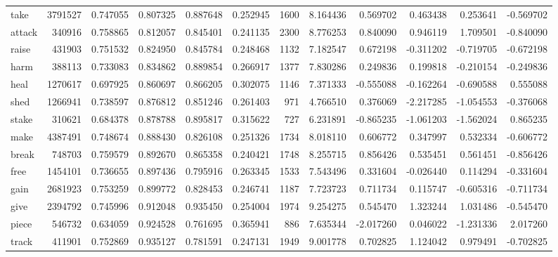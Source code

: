 \begin{tabular}{lrrrrrrrrrrr}
take      &   3791527 &  0.747055 &      0.807325 &    0.887648 &  0.252945 &  1600 &  8.164436 &  0.569702 &  0.463438 &  0.253641 &     -0.569702 \\
attack    &    340916 &  0.758865 &      0.812057 &    0.845401 &  0.241135 &  2300 &  8.776253 &  0.840090 &  0.946119 &  1.709501 &     -0.840090 \\
raise     &    431903 &  0.751532 &      0.824950 &    0.845784 &  0.248468 &  1132 &  7.182547 &  0.672198 & -0.311202 & -0.719705 &     -0.672198 \\
harm      &    388113 &  0.733083 &      0.834862 &    0.889854 &  0.266917 &  1377 &  7.830286 &  0.249836 &  0.199818 & -0.210154 &     -0.249836 \\
heal      &   1270617 &  0.697925 &      0.860697 &    0.866205 &  0.302075 &  1146 &  7.371333 & -0.555088 & -0.162264 & -0.690588 &      0.555088 \\
shed      &   1266941 &  0.738597 &      0.876812 &    0.851246 &  0.261403 &   971 &  4.766510 &  0.376069 & -2.217285 & -1.054553 &     -0.376068 \\
stake     &    310621 &  0.684378 &      0.878788 &    0.895817 &  0.315622 &   727 &  6.231891 & -0.865235 & -1.061203 & -1.562024 &      0.865235 \\
make      &   4387491 &  0.748674 &      0.888430 &    0.826108 &  0.251326 &  1734 &  8.018110 &  0.606772 &  0.347997 &  0.532334 &     -0.606772 \\
break     &    748703 &  0.759579 &      0.892670 &    0.865358 &  0.240421 &  1748 &  8.255715 &  0.856426 &  0.535451 &  0.561451 &     -0.856426 \\
free      &   1454101 &  0.736655 &      0.897436 &    0.795916 &  0.263345 &  1533 &  7.543496 &  0.331604 & -0.026440 &  0.114294 &     -0.331604 \\
gain      &   2681923 &  0.753259 &      0.899772 &    0.828453 &  0.246741 &  1187 &  7.723723 &  0.711734 &  0.115747 & -0.605316 &     -0.711734 \\
give      &   2394792 &  0.745996 &      0.912048 &    0.935450 &  0.254004 &  1974 &  9.254275 &  0.545470 &  1.323244 &  1.031486 &     -0.545470 \\
piece     &    546732 &  0.634059 &      0.924528 &    0.761695 &  0.365941 &   886 &  7.635344 & -2.017260 &  0.046022 & -1.231336 &      2.017260 \\
track     &    411901 &  0.752869 &      0.935127 &    0.781591 &  0.247131 &  1949 &  9.001778 &  0.702825 &  1.124042 &  0.979491 &     -0.702825 \\

\end{tabular}
